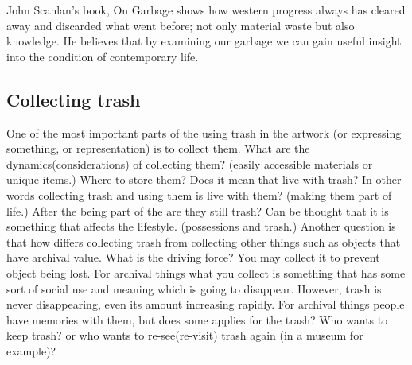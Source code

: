 John Scanlan's book, On Garbage shows how western progress always has cleared away and discarded what went before; not only material waste but also knowledge. He believes that by examining our garbage we can gain useful insight into the condition of contemporary life.

\subsection{Collecting trash}
One of the most important parts of the using trash in the artwork (or expressing something, or representation) is to collect them. What are the dynamics(considerations) of collecting them? (easily accessible materials or unique items.) Where to store them? Does it mean that live with trash? In other words collecting trash and using them is live with them? (making them part of life.) After the being part of the are they still trash? Can be thought that it is something that affects the lifestyle. (possessions and trash.) Another question is that how differs collecting trash from collecting other things such as objects that have archival value. What is the driving force? You may collect it to prevent object being lost. For archival things what you collect is something that has some sort of social use and meaning which is going to disappear. However, trash is never disappearing, even its amount increasing rapidly. For archival things people have memories with them, but does some applies for the trash? Who wants to keep trash? or who wants to re-see(re-visit) trash again (in a museum for example)?


